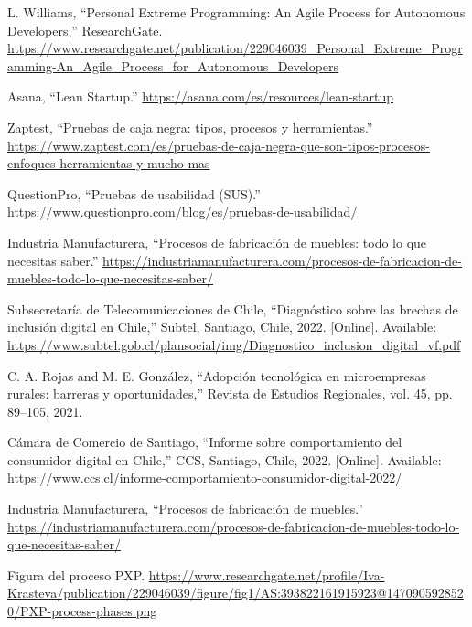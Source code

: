 \documentclass[12pt,oneside]{article}
\begin{document}
\noindent [13] L. Williams, “Personal Extreme Programming: An Agile Process for Autonomous Developers,” ResearchGate. \url{https://www.researchgate.net/publication/229046039_Personal_Extreme_Programming-An_Agile_Process_for_Autonomous_Developers} \vspace{0.5em}

\noindent [14] Asana, “Lean Startup.” \url{https://asana.com/es/resources/lean-startup} \vspace{0.5em}

\noindent [15] Zaptest, “Pruebas de caja negra: tipos, procesos y herramientas.” \url{https://www.zaptest.com/es/pruebas-de-caja-negra-que-son-tipos-procesos-enfoques-herramientas-y-mucho-mas} \vspace{0.5em}

\noindent [16] QuestionPro, “Pruebas de usabilidad (SUS).” \url{https://www.questionpro.com/blog/es/pruebas-de-usabilidad/} \vspace{0.5em}

\noindent [17] Industria Manufacturera, “Procesos de fabricación de muebles: todo lo que necesitas saber.” \url{https://industriamanufacturera.com/procesos-de-fabricacion-de-muebles-todo-lo-que-necesitas-saber/} \vspace{0.5em}

\noindent [18] Subsecretaría de Telecomunicaciones de Chile, “Diagnóstico sobre las brechas de inclusión digital en Chile,” Subtel, Santiago, Chile, 2022. [Online]. Available: \url{https://www.subtel.gob.cl/plansocial/img/Diagnostico_inclusion_digital_vf.pdf} \vspace{0.5em}

\noindent [19] C. A. Rojas and M. E. González, “Adopción tecnológica en microempresas rurales: barreras y oportunidades,” Revista de Estudios Regionales, vol. 45, pp. 89–105, 2021. \vspace{0.5em}

\noindent [20] Cámara de Comercio de Santiago, “Informe sobre comportamiento del consumidor digital en Chile,” CCS, Santiago, Chile, 2022. [Online]. Available: \url{https://www.ccs.cl/informe-comportamiento-consumidor-digital-2022/} \vspace{0.5em}

\noindent [21] Industria Manufacturera, “Procesos de fabricación de muebles.” \url{https://industriamanufacturera.com/procesos-de-fabricacion-de-muebles-todo-lo-que-necesitas-saber/} \vspace{0.5em}

\noindent [22] Figura del proceso PXP. \url{https://www.researchgate.net/profile/Iva-Krasteva/publication/229046039/figure/fig1/AS:393822161915923@1470905928520/PXP-process-phases.png} \vspace{0.5em}

\endgroup
\end{document}
